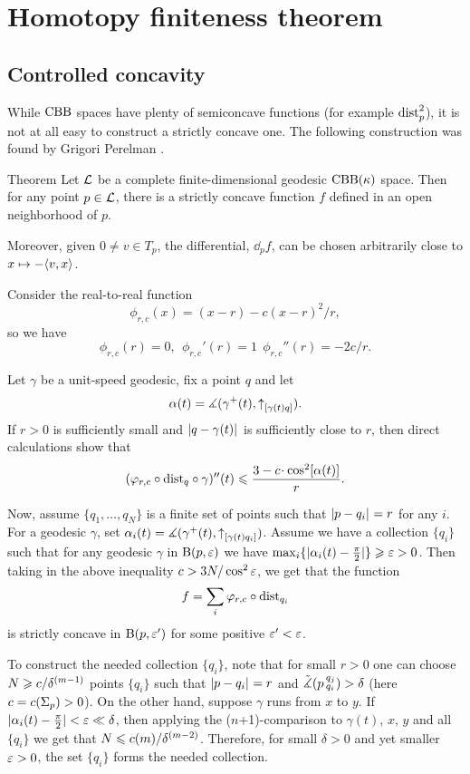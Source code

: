 \chapter{Homotopy finiteness theorem}

\section{Controlled concavity}

While $\mathrm{CBB}$ spaces have plenty of semiconcave functions (for example $\mathrm{dist}_p^2$), 
it is not at all easy to construct a strictly concave one. 
The following construction was found by Grigori Perelman \cite{perelman1993,perelman1994}.


\begin{thm}{Theorem}
\label{thm:strictly-concave}
Let $\mathcal{L}$ be a complete finite-dimensional geodesic $\mathrm{CBB}(\kappa)$ space.
Then for any point $p\in \mathcal{L}$, there is  a strictly concave function $f$ defined in an
open neighborhood of $p$.

Moreover, given $0\ne v\in T_p$, the differential, $\dd_p f$, can be chosen
arbitrarily close to $x\mapsto -\langle v,x\rangle$.
\end{thm}



Consider the real-to-real function 
$$\phi_{r,c}(x)=(x-r)- c{(x-r)^2}/r,$$
so we have 
$$\phi_{r,c}(r)=0,\ \ \phi_{r,c}'(r)=1\ \ \phi_{r,c}''(r)=- {2c}/{r}.$$ 

Let $\gamma$ be a unit-speed geodesic, fix a point $q$ and let 
$$\alpha(t)=\measuredangle(\gamma^+(t),{\uparrow}_{[{\gamma(t)}{q}]}).$$
If $r>0$ is sufficiently small and $\dist q{\gamma(t)}{}$ is sufficiently close to
$r$, then direct calculations show that
$$(\phi_{r,c}\circ\distfun_q\circ\gamma)''(t)
\le 
\frac{3-c\cdot \cos^2[\alpha(t)]}{r}.$$

Now, assume $\{q_1,\dots, q_N\}$ is a finite set of points such that $\dist p{q_i}{}=r$ for any $i$. 
For a geodesic $\gamma$, set $\alpha_i(t)=\measuredangle(\gamma^+(t),{\uparrow}_{[{\gamma(t)}{q_i}]})$. 
Assume we have a collection $\{q_i\}$ such
that for any geodesic $\gamma$ in $\mathrm{B}{}(p,\varepsilon)$
we have $\max_i\{|\alpha_i(t)-\tfrac\pi2|\}\geqslant\varepsilon>0$. 
Then taking in the above inequality $c>3N/\cos^2\varepsilon$, we get that the function
$$f=\sum_i \varphi_{r,c}\circ\mathrm{dist}_{q_i}$$
is strictly concave in $\mathrm{B}{}(p,\varepsilon')$ for some positive $\varepsilon'<\varepsilon$.

To construct the needed collection $\{q_i\}$, note that for small $r>0$ one can
choose $N\geqslant c/\delta^{(m-1)}$ points $\{q_i\}$ such that $\dist{p}{q_i}{}=r$
and $\tilde\measuredangle(p\,{}^{q_j}_{q_i})>\delta$ (here $c=c(\Sigma_p)>0$).
On the other hand, suppose $\gamma$ runs from $x$ to $y$.
If $|\alpha_i(t)- \tfrac\pi2|<\varepsilon\ll\delta$, then applying the ($n$+1)-comparison to $\gamma(t)$, $x$, $y$ and all $\{q_i\}$ we get that
$N\leqslant c(m)/\delta^{(m-2)}$. 
Therefore, for small $\delta>0$ and yet smaller $\varepsilon>0$, the set $\{q_i\}$ forms the needed collection.

